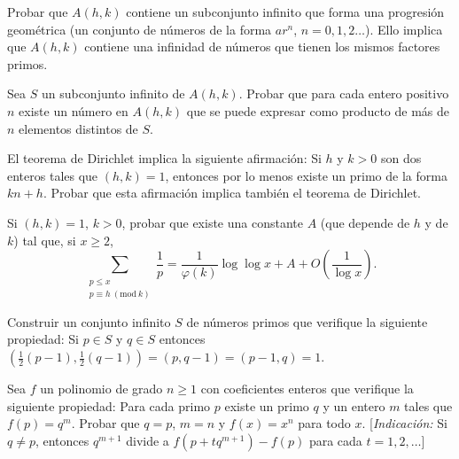 \documentclass[12pt,a4paper]{book}
\begin{document}
    \begin{ejercicio}
        Probar que $A(h,k)$ contiene un subconjunto infinito que forma una progresión
        geométrica (un conjunto de números de la forma $ar^{n}$, $n=0,1,2\dots$). Ello
        implica que $A(h,k)$ contiene una infinidad de números que tienen los mismos
        factores primos.
    \end{ejercicio}

    \begin{ejercicio}
        Sea $S$ un subconjunto infinito de $A(h,k)$. Probar que para cada entero positivo
        $n$ existe un número en $A(h,k)$ que se puede expresar como producto de más de $n$
        elementos distintos de $S$.
    \end{ejercicio}

    \begin{ejercicio}
        El teorema de Dirichlet implica la siguiente afirmación: Si $h$ y $k>0$ son dos
        enteros tales que $(h,k)=1$, entonces por lo menos existe un primo de la forma
        $kn+h$. Probar que esta afirmación implica también el teorema de Dirichlet.
    \end{ejercicio}

    \begin{ejercicio}
        Si $(h,k)=1$, $k>0$, probar que existe una constante $A$ (que depende de $h$ y de
        $k$) tal que, si $x\geq2$,
        \begin{equation*}
            \sum_{\substack{p\leq x\\p\equiv h\ (\mathrm{mod}\ k)}}\frac{1}{p}
            =\frac{1}{\varphi(k)}\log\log x+A+O\left(\frac{1}{\log x}\right).
        \end{equation*}
    \end{ejercicio}

    \begin{ejercicio}
        Construir un conjunto infinito $S$ de números primos que verifique la siguiente
        propiedad: Si $p\in S$ y $q\in S$ entonces
        $\left(\tfrac{1}{2}(p-1),\tfrac{1}{2}(q-1)\right)=(p,q-1)=(p-1,q)=1$.
    \end{ejercicio}

    \begin{ejercicio}
        Sea $f$ un polinomio de grado $n\geq1$ con coeficientes enteros que verifique la
        siguiente propiedad: Para cada primo $p$ existe un primo $q$ y un entero $m$ tales
        que $f(p)=q^{m}$. Probar que $q=p$, $m=n$ y $f(x)=x^{n}$ para todo $x$.
        [\textit{Indicación:} Si $q\neq p$, entonces $q^{m+1}$ divide a
        $f(p+tq^{m+1})-f(p)$ para cada $t=1,2,\dots$]
    \end{ejercicio}
\end{document}
